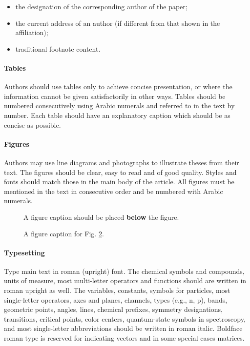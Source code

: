 \begin{itemize}
\item the designation of the corresponding author of the paper;
\item the current address of an author (if different from that shown in the affiliation);
\item traditional footnote content.
\end{itemize}

\paragraph{Tables}
    Authors should use tables only to achieve concise presentation, or where the information cannot be given satisfactorily in other ways. Tables should be numbered consecutively using Arabic numerals and referred to in the text by number. Each table should have an explanatory caption which should be as concise as possible.



\paragraph{Figures}
    Authors may use line diagrams and photographs to illustrate theses from their text. The figures should be clear, easy to read and of good quality. Styles and fonts should match those in the main body of the article. All figures must be mentioned in the text in consecutive order and be numbered with Arabic numerals. 

\begin{figure}
\caption{A figure caption should be placed {\bf below} the figure.\label{fig1}}
\end{figure}

\begin{figure}
\caption{A figure caption for Fig. \ref{fig2}.\label{fig2}}
\end{figure}

\paragraph{Typesetting}
    Type main text in roman (upright) font. The chemical symbols and compounds, units of measure, most multi-letter operators and functions should are written in roman upright as well. The variables, constants, symbols for particles, most single-letter operators, axes and planes, channels, types (e.g., n, p), bands, geometric points, angles, lines, chemical prefixes, symmetry designations, transitions, critical points, color centers, quantum-state symbols in spectroscopy, and most single-letter abbreviations should be written in roman italic. Boldface roman type is reserved for indicating vectors and in some special cases matrices. 


